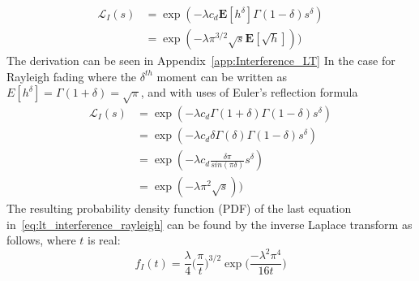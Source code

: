 %
\begin{equation}\label{eq:lt_interference_fading}
  \begin{split}
  \mathcal{L}_I(s) &= \exp(-\lambda c_d \textbf{E}[h^\delta] \Gamma(1-\delta)s^\delta) \\
  &= \exp(- \lambda \pi^{3/2} \sqrt{s} \textbf{E}[\sqrt{h}]))
  \end{split}
\end{equation}
%
The derivation can be seen in Appendix~\ref{app:Interference_LT}
In the case for Rayleigh fading where the $\delta^{th}$ moment can be written as $E[h^{\delta}]=\Gamma(1+\delta)=\sqrt{\pi}$, and with uses of Euler's reflection formula
%
\begin{equation}\label{eq:lt_interference_rayleigh}
  \begin{split}
  \mathcal{L}_I(s) &= \exp(-\lambda c_d \Gamma(1+\delta) \Gamma(1-\delta)s^\delta) \\
   &= \exp(-\lambda c_d \delta \Gamma(\delta) \Gamma(1-\delta)s^\delta) \\
   &= \exp(-\lambda c_d  \frac{\delta \pi}{sin(\pi \delta)} s^\delta) \\
   &= \exp(- \lambda \pi^{2} \sqrt{s}))
  \end{split}
\end{equation}
%
The resulting probability density function (PDF) of the last equation in~\eqref{eq:lt_interference_rayleigh} can be found by the inverse Laplace transform as follows, where $t$ is real:
%
\begin{equation}\label{eq:lt_interference_rayleigh}
  f_I(t) = \frac{\lambda}{4} \Big( \frac{\pi}{t} \Big)^{3/2} \exp \Big(\frac{-\lambda^2 \pi^4}{16t}\Big)
\end{equation}
%
